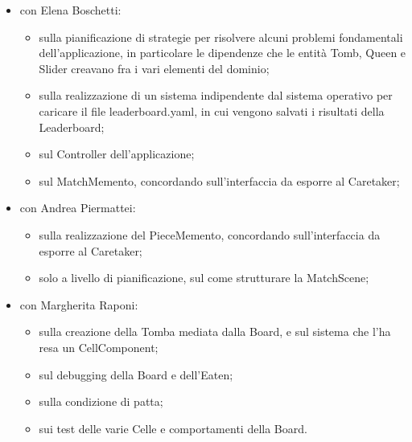 \documentclass[a4paper,12pt]{report}
\begin{document}
\begin{itemize}
	
	\item con Elena Boschetti:
	
	\begin{itemize}
		
		\item sulla pianificazione di strategie per risolvere alcuni problemi fondamentali dell'applicazione, in particolare le dipendenze che le entità Tomb, Queen e Slider creavano fra i vari elementi del dominio;
		
		\item sulla realizzazione di un sistema indipendente dal sistema operativo per caricare il file leaderboard.yaml, in cui vengono salvati i risultati della Leaderboard;
		
		\item sul Controller dell'applicazione;
		
		\item sul MatchMemento, concordando sull'interfaccia da esporre al Caretaker;
				
	\end{itemize}

	\item con Andrea Piermattei:
	
	\begin{itemize}
		
		\item sulla realizzazione del PieceMemento, concordando sull'interfaccia da esporre al Caretaker;
		
		\item solo a livello di pianificazione, sul come strutturare la MatchScene;
		
	\end{itemize}

	\item con Margherita Raponi:
	
	\begin{itemize}
		
		\item sulla creazione della Tomba mediata dalla Board, e sul sistema che l'ha resa un CellComponent;
		
		\item sul debugging della Board e dell'Eaten;
		
		\item sulla condizione di patta;
		
		\item sui test delle varie Celle e comportamenti della Board.
		
	\end{itemize}

\end{itemize}
\end{document}
